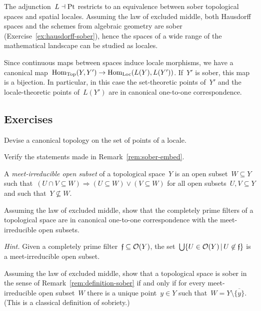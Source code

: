 \documentclass{ws-rv9x6}
\begin{document}
{\begin{remark}
The adjunction~$L \dashv \mathrm{Pt}$ restricts to an equivalence between sober
topological spaces and spatial locales. Assuming the law of excluded middle,
both Hausdorff spaces and the schemes from algebraic geometry are sober
(Exercise~\ref{ex:hausdorff-sober}), hence the spaces of a wide
range of the mathematical landscape can be studied as locales.\end{remark}

\begin{remark}\label{rem:sober-embed}
Since continuous maps between spaces induce locale morphisms, we
have a canonical map~$\mathrm{Hom}_{\mathrm{Top}}(Y,Y') \to \mathrm{Hom}_{\mathrm{Loc}}(L(Y),L(Y'))$. If~$Y'$ is
sober, this map is a bijection. In particular, in this case the set-theoretic points
of~$Y'$ and the locale-theoretic points of~$L(Y')$ are in canonical
one-to-one correspondence.
\end{remark}


\subsection*{Exercises}

\begin{exercise}%
\label{ex:canonical-topology}%
Devise a canonical to\-po\-logy on the set of points of a locale.
\end{exercise}

\begin{exercise}%
Verify the statements made in Remark~\ref{rem:sober-embed}.
\end{exercise}

\begin{exercise}%
\label{ex:hausdorff-sober}%
A \emph{meet-irreducible open subset} of a topological space~$Y$ is an
open subset~$W \subseteq Y$ such that~$(U \cap V \subseteq W) \Rightarrow (U
\subseteq W) \vee (V \subseteq W)$ for all open subsets~$U,V \subseteq Y$ and
such that~$Y \not\subseteq W$.
\begin{alphlist}[(c)]
\item Assuming the law of excluded middle, show that the completely prime
filters of a topological space are in canonical one-to-one correspondence with
the meet-irreducible open subsets.\smallskip

{\scriptsize\emph{Hint.} Given a completely prime filter~$\mathfrak{f} \subseteq
\mathcal{O}(Y)$, the set~$\bigcup\{ U \in \mathcal{O}(Y) \,|\, U \not\in \mathfrak{f} \}$ is a
meet-irreducible open subset.\par}
\item Assuming the law of excluded middle, show that a topological space is
sober in the sense of Remark~\ref{rem:definition-sober} if and only if for
every meet-irreducible open subset~$W$ there is a unique point~$y \in Y$ such
that~$W = Y \setminus \overline{\{y\}}$.
(This is a classical definition of sobriety.)


\end{alphlist}
\end{exercise}}
\end{document}
